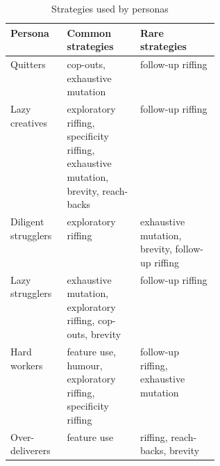 \begin{table*}
    \begin{tabular}{|l|p{0.35\linewidth}|l|}
        \hline
        \textbf{Persona} & \textbf{Common strategies} & \textbf{Rare strategies} \\
        \hline
        Quitters & cop-outs, exhaustive mutation & follow-up riffing \\
        \hline
        Lazy creatives & exploratory riffing, specificity riffing, \newline
        exhaustive mutation, brevity, reach-backs  & follow-up riffing  \\
        \hline
        Diligent strugglers & exploratory riffing & exhaustive mutation, brevity, \newline
        follow-up riffing \\
        \hline
        Lazy strugglers & exhaustive mutation, exploratory riffing, \newline
        cop-outs, brevity  & follow-up riffing \\
        \hline
        Hard workers & feature use, humour, \newline
        exploratory riffing, specificity riffing  & follow-up riffing, exhaustive mutation \\
        \hline
        Over-deliverers & feature use & riffing, reach-backs, brevity \\
        \hline
    \end{tabular}
    \caption{Strategies used by personas}
\end{table*}
